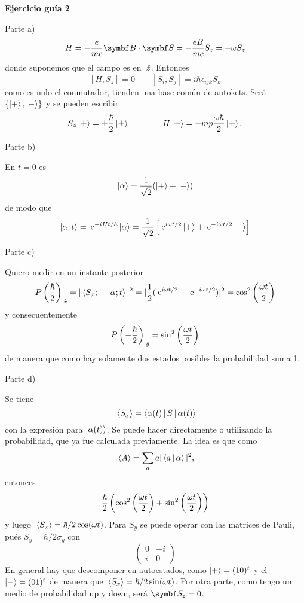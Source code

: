 \documentclass[10pt,oneside]{CBFT_book}
\begin{document}


\begin{ejemplo}{\bf Ejercicio guía 2}

Parte a)
\[
	H = -\frac{e}{mc} \pe{B}{S} = -\frac{eB}{mc} S_z = - \omega S_z
\]
donde suponemos que el campo es en $\:\hat{z}$.
Entonces
\[
	[H,S_z] = 0 \qquad [S_i,S_j] = i \hbar \epsilon_{ijk} S_k
\]
como es nulo el conmutador, tienden una base común de autokets. Será $\{ \Ket{+}, \Ket{-} \}$
y se pueden escribir
\[
	S_z \Ket{\pm} = \pm \frac{\hbar}{2}\Ket{\pm} \qquad \qquad 
	H \Ket{\pm} = -mp \frac{ \omega \hbar }{2} \Ket{\pm}.
\]

Parte b)

En $t=0$ es 
\[
	\Ket{\alpha} = \frac{1}{\sqrt{2}} ( \Ket{+} + \Ket{-} )
\]
de modo que
\[
	\Ket{\alpha,t} = \:\mathrm{e}^{ - i H t / \hbar } \Ket{\alpha} =
	\frac{1}{\sqrt{2}} \left[ \:\mathrm{e}^{ i \omega t / 2 } \Ket{+} + \:\mathrm{e}^{ -i \omega t / 2 } \Ket{-} \right] 
\]


Parte c)

Quiero medir en un instante posterior
\[
	P\left(\frac{\hbar}{2}\right)_{\:\hat{x}} = |\Braket{S_x;+|\alpha;t}|^2 = 
	| \frac{1}{2}( \:\mathrm{e}^{i \omega t / 2} +  \:\mathrm{e}^{-i \omega t / 2} ) |^2 = \cos^2\left( \frac{ \omega t }{ 2 } \right)
\]
y consecuentemente
\[
	P\left(-\frac{\hbar}{2}\right)_{\:\hat{y}} = \sin^2\left( \frac{ \omega t }{ 2 } \right)
\]
de manera que como hay solamente dos estados posibles la probabilidad suma 1.

Parte d)

Se tiene
\[
	\:\left\langle S_x \right\rangle = \Braket{\alpha(t) |S| \alpha(t)}
\]
con la expresión para $\Ket{\alpha(t)}$. Se puede hacer directamente o utilizando la probabilidad, que ya fue
calculada previamente. La idea es que como
\[
	\:\left\langle A \right\rangle = \sum_a a |\Braket{a|\alpha}|^2,
\]
entonces
\[
	\frac{\hbar}{2} \left( \cos^2\left( \frac{ \omega t }{ 2 } \right) + \sin^2\left( \frac{ \omega t }{ 2 } \right) \right)
\]
y luego $ \:\left\langle S_x \right\rangle = \hbar/2 \cos(\omega t)$.
Para $S_y$ se puede operar con las matrices de Pauli, pués $S_y = \hbar /2 \sigma_y$ con
\[
	\begin{pmatrix}
		0 & -i \\
		i &  0
	\end{pmatrix}
\]
En general hay que descomponer en autoestados, como $\Ket{+} = ( 1 0 )^t$ y el $\Ket{-} = ( 0 1 )^t$
de manera que $ \:\left\langle S_x \right\rangle = \hbar/2 \sin(\omega t) $.
Por otra parte, como tengo un medio de probabilidad up y down, será $\vb{S_z} = 0$.


\end{ejemplo}
\end{document}
